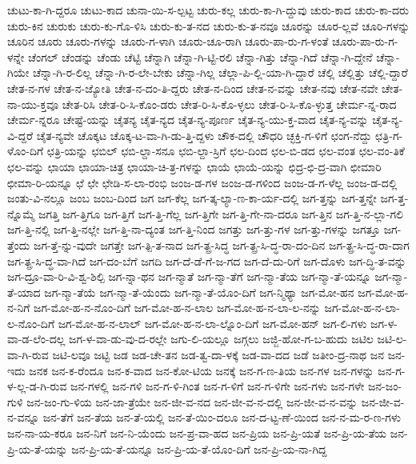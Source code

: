 {ಚುಟು-ಕಾ-ಗಿ-ದ್ದರೂ
ಚುಟು-ಕಾದ
ಚುನಾ-ಯಿ-ಸ-ಲ್ಪಟ್ಟ
ಚುರು-ಕಲ್ಲ
ಚುರು-ಕಾ-ಗಿ-ದ್ದುವು
ಚುರು-ಕಾದ
ಚುರು-ಕಾ-ದರು
ಚುರು-ಕಿನ
ಚುರುಕು
ಚುರು-ಕು-ಗೊ-ಳಿಸಿ
ಚುರು-ಕು-ತ-ನದ
ಚುರು-ಕು-ತ-ನವೂ
ಚೂರನ್ನು
ಚೂರ-ಲ್ಲವೆ
ಚೂರಿ-ಗಳನ್ನು
ಚೂರಿನ
ಚೂರು
ಚೂರು-ಗಳನ್ನು
ಚೂರು-ಗ-ಳಾಗಿ
ಚೂರು-ಚೂ-ರಾಗಿ
ಚೂರು-ಪಾ-ರು-ಗ-ಳಂತೆ
ಚೂರು-ಪಾ-ರು-ಗ-ಳನ್ನೇ
ಚೆಂಗಲ್
ಚೆಂಡನ್ನು
ಚೆಂಡು
ಚೆಟ್ಟಿ
ಚೆನ್ನಾಗಿ
ಚೆನ್ನಾ-ಗಿ-ಟ್ಟಿ-ರಲಿ
ಚೆನ್ನಾ-ಗಿತ್ತು
ಚೆನ್ನಾ-ಗಿದೆ
ಚೆನ್ನಾ-ಗಿ-ದ್ದೇನೆ
ಚೆನ್ನಾ-ಗಿಯೇ
ಚೆನ್ನಾ-ಗಿ-ರ-ಲಿಲ್ಲ
ಚೆನ್ನಾ-ಗಿ-ರ-ಲೇ-ಬೇಕು
ಚೆನ್ನಾ-ಗಿಲ್ಲ
ಚೆಲ್ಲಾ-ಪಿ-ಲ್ಲಿ-ಯಾ-ಗಿ-ದ್ದಾರೆ
ಚೆಲ್ಲಿ
ಚೆಲ್ಲಿತ್ತು
ಚೆಲ್ಲಿ-ದ್ದಾರೆ
ಚೇತ-ನ-ಗಳ
ಚೇತ-ನ-ಜ್ಯೋತಿ
ಚೇತ-ನ-ದಂ-ತಿ-ದ್ದರು
ಚೇತ-ನ-ದಿಂದ
ಚೇತ-ನ-ವನ್ನು
ಚೇತ-ನವು
ಚೇತ-ನವೇ
ಚೇತ-ನಾ-ಯು-ಕ್ತವೂ
ಚೇತ-ರಿಸಿ
ಚೇತ-ರಿ-ಸಿ-ಕೊಂ-ಡರು
ಚೇತ-ರಿ-ಸಿ-ಕೊ-ಳ್ಳಲು
ಚೇತ-ರಿ-ಸಿ-ಕೊ-ಳ್ಳುತ್ತ
ಚೇರ್ಮ-ನ್ನ-ರಾದ
ಚೇರ್ಮ-ನ್ನರೂ
ಚೇಷ್ಟೆ-ಯನ್ನು
ಚೈತನ್ಯ
ಚೈತ-ನ್ಯದ
ಚೈತ-ನ್ಯ-ಪೂರ್ಣ
ಚೈತ-ನ್ಯ-ಯು-ಕ್ತ-ವಾದ
ಚೈತ-ನ್ಯ-ವನ್ನು
ಚೈತ-ನ್ಯ-ವಿ-ದ್ದರೆ
ಚೈತ-ನ್ಯವೇ
ಚೊಕ್ಕಟ
ಚೊಕ್ಕ-ಟ-ವಾ-ಗಿ-ಡು-ತ್ತಿ-ದ್ದಳು
ಚೌಕ-ದಲ್ಲಿ
ಚೌಧರಿ
ಚ್ಛಕ್ತಿ-ಗ-ಳಿಗೆ
ಛಂಗ-ನೆದ್ದು
ಛತ್ರಿ-ಗ-ಳೊಂ-ದಿಗೆ
ಛತ್ರಿ-ಯನ್ನು
ಛಬಿಲ್
ಛಬಿ-ಲ್ದಾ-ಸನೂ
ಛಬಿ-ಲ್ದಾ-ಸ್ರಿಗೆ
ಛಲ-ದಿಂದ
ಛಲ-ಬಿ-ಡದ
ಛಲ-ವಂತ
ಛಲ-ವಂ-ತಿಕೆ
ಛಲ-ವನ್ನು
ಛಾಯಾ
ಛಾಯಾ-ಚಿತ್ರ
ಛಾಯಾ-ಚಿ-ತ್ರ-ಗಳನ್ನು
ಛಾಯೆ
ಛಾಯೆ-ಯನ್ನು
ಛಿದ್ರ-ಛಿ-ದ್ರ-ವಾಗಿ
ಛೀಮಾರಿ
ಛೀಮಾ-ರಿ-ಯನ್ನೂ
ಛೆ
ಛೇ
ಛೇಡಿ-ಸ-ಲಾ-ರಂಭಿ
ಜಂಜ-ಡ-ಗಳ
ಜಂಜ-ಡ-ಗಳಿಂದ
ಜಂಜ-ಡ-ಗ-ಳೆಲ್ಲ
ಜಂಜ-ಡ-ದಲ್ಲಿ
ಜಂತು-ವಿ-ನಲ್ಲೂ
ಜಂಬ
ಜಂಬ-ದಿಂದ
ಜಗ
ಜಗ-ಕೆಲ್ಲ
ಜಗ-ತ್ಕ-ಲ್ಯಾ-ಣ-ಕಾ-ರ್ಯ-ದಲ್ಲಿ
ಜಗ-ತ್ತನ್ನು
ಜಗ-ತ್ತನ್ನೇ
ಜಗ-ತ್ತ-ನ್ನೊಮ್ಮೆ
ಜಗತ್ತಿ
ಜಗ-ತ್ತಿಗೂ
ಜಗ-ತ್ತಿಗೆ
ಜಗ-ತ್ತಿ-ಗೆಲ್ಲ
ಜಗ-ತ್ತಿಗೇ
ಜಗ-ತ್ತಿ-ಗೇ-ನಾ-ದರೂ
ಜಗ-ತ್ತಿನ
ಜಗ-ತ್ತಿ-ನ-ಲ್ಲಾ-ಗಲಿ
ಜಗ-ತ್ತಿ-ನಲ್ಲಿ
ಜಗ-ತ್ತಿ-ನಲ್ಲೇ
ಜಗ-ತ್ತಿ-ನಾ-ದ್ಯಂತ
ಜಗ-ತ್ತಿ-ನಿಂದ
ಜಗತ್ತು
ಜಗ-ತ್ತು-ಗಳ
ಜಗ-ತ್ತು-ಗಳನ್ನು
ಜಗತ್ತೂ
ಜಗ-ತ್ತೆಂದು
ಜಗ-ತ್ತೆ-ನ್ನು-ವುದೇ
ಜಗತ್ತೇ
ಜಗ-ತ್ಪಿ-ತ-ನಾದ
ಜಗ-ತ್ಪ್ರ-ಸಿದ್ಧ
ಜಗ-ತ್ಪ್ರ-ಸಿ-ದ್ಧ-ರಾ-ದಂ-ದಿನ
ಜಗ-ತ್ಪ್ರ-ಸಿ-ದ್ಧ-ರಾ-ದಾಗ
ಜಗ-ತ್ಪ್ರ-ಸಿ-ದ್ಧ-ವಾ-ಗಿದೆ
ಜಗ-ದಂ-ಬೆಗೆ
ಜಗದಿ
ಜಗ-ದೆ-ಡೆ-ಗೆ-ಜ-ಗದ
ಜಗ-ದೆ-ದು-ರಿಗೆ
ಜಗ-ದೊಳು
ಜಗ-ದ್ಧಿ-ತ-ವನ್ನು
ಜಗ-ದ್ರೂ-ವಾ-ರಿ-ವಿ-ಶ್ವ-ಶಿಲ್ಪಿ
ಜಗ-ನ್ನಾ-ಥನ
ಜಗ-ನ್ಮಾತೆ
ಜಗ-ನ್ಮಾ-ತೆಗೆ
ಜಗ-ನ್ಮಾ-ತೆಯ
ಜಗ-ನ್ಮಾ-ತೆ-ಯನ್ನೂ
ಜಗ-ನ್ಮಾ-ತೆ-ಯಾದ
ಜಗ-ನ್ಮಾ-ತೆಯೆ
ಜಗ-ನ್ಮಾ-ತೆ-ಯೆಂದು
ಜಗ-ನ್ಮಾ-ತೆ-ಯೊಂ-ದಿಗೆ
ಜಗ-ನ್ಮಿಥ್ಯಾ
ಜಗ-ಮೋ-ಹನ
ಜಗ-ಮೋ-ಹ-ನ-ನಿಗೆ
ಜಗ-ಮೋ-ಹ-ನ-ನೊಂ-ದಿಗೆ
ಜಗ-ಮೋ-ಹ-ನ-ಲಾಲ
ಜಗ-ಮೋ-ಹ-ನ-ಲಾ-ಲ-ನನ್ನು
ಜಗ-ಮೋ-ಹ-ನ-ಲಾ-ಲ-ನೊಂ-ದಿಗೆ
ಜಗ-ಮೋ-ಹ-ನ-ಲಾಲ್
ಜಗ-ಮೋ-ಹ-ನ-ಲಾ-ಲ್ನೊಂ-ದಿಗೆ
ಜಗ-ಮೋ-ಹನ್
ಜಗ-ಲಿ-ಗಳು
ಜಗ-ಳ-ವಾ-ಡ-ಲೆಂ-ದಲ್ಲ
ಜಗ-ಳ-ವಾ-ಡು-ವು-ದ-ರಲ್ಲೇ
ಜಗು-ಲಿ-ಯಲ್ಲೂ
ಜಗ್ಗಲು
ಜಜ್ಜಿ-ಹೋ-ಗ-ಬ-ಹುದು
ಜಟಿಲ
ಜಟಿ-ಲ-ವಾ-ಗಿ-ರುವ
ಜಟಿ-ಲವೂ
ಜಟ್ಟಿ
ಜಡ
ಜಡ-ಚೇ-ತನ
ಜಡ-ತ್ವ-ದಾ-ಳಕ್ಕೆ
ಜಡ-ವಾ-ದದ
ಜಡೆ
ಜತೀಂ-ದ್ರ-ನಾಥ
ಜನ
ಜನ-ಇದು
ಜನಕ
ಜನ-ಕ-ರೆಂದೂ
ಜನ-ಕ-ವಾದ
ಜನ-ಕೋ-ಟಿಯ
ಜನಕ್ಕೆ
ಜನ-ಗ-ಣ-ತಿಯ
ಜನ-ಗಳ
ಜನ-ಗಳನ್ನು
ಜನ-ಗ-ಳ-ಲ್ಲ-ಡ-ಗಿ-ರುವ
ಜನ-ಗಳಲ್ಲಿ
ಜನ-ಗಳಿ
ಜನ-ಗ-ಳಿ-ಗಿಂತ
ಜನ-ಗ-ಳಿಗೆ
ಜನ-ಗ-ಳಿಗೇ
ಜನ-ಗಳು
ಜನ-ಗಳೇ
ಜನ-ಜಂ-ಗುಳಿ
ಜನ-ಜಂ-ಗು-ಳಿಯ
ಜನ-ಜಾ-ತ್ರೆಯೇ
ಜನ-ಜೀ-ವ-ನದ
ಜನ-ಜೀ-ವ-ನ-ದಲ್ಲಿ
ಜನ-ಜೀ-ವ-ನ-ವನ್ನು
ಜನ-ಜೀ-ವ-ನ-ವನ್ನೂ
ಜನ-ತೆಗೆ
ಜನ-ತೆಯ
ಜನ-ತೆ-ಯಲ್ಲಿ
ಜನ-ತೆ-ಯಿಂ-ದಲೂ
ಜನ-ದ-ಟ್ಟ-ಣೆ-ಯಿಂದ
ಜನ-ನ-ಮ-ರ-ಣ-ಗಳು
ಜನ-ನಾ-ಯ-ಕರೂ
ಜನ-ನಿಗೆ
ಜನ-ನಿ-ಯೆಂದು
ಜನ-ಪ್ರ-ವಾ-ಹದ
ಜನ-ಪ್ರಿಯ
ಜನ-ಪ್ರಿ-ಯತೆ
ಜನ-ಪ್ರಿ-ಯ-ತೆಯ
ಜನ-ಪ್ರಿ-ಯ-ತೆ-ಯನ್ನು
ಜನ-ಪ್ರಿ-ಯ-ತೆ-ಯನ್ನೂ
ಜನ-ಪ್ರಿ-ಯ-ತೆ-ಯೊಂ-ದಿಗೆ
ಜನ-ಪ್ರಿ-ಯ-ನಾ-ಗಿದ್ದ
}

